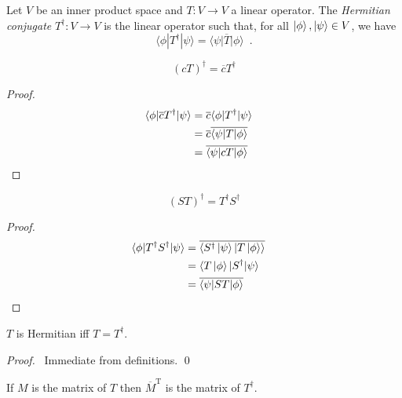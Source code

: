 \begin{df}
Let $V$ be an inner product space and $T : V \rightarrow V$ a linear operator. The \emph{Hermitian conjugate} $T^\dagger : V \rightarrow V$ is the linear operator such that, for all $\ket{\phi}, \ket{\psi} \in V$, we have
\[ \langle \phi | T^\dagger | \psi \rangle = \overline{\langle \psi | T | \phi \rangle} \enspace . \]
\end{df}

\begin{prop}
\[ (cT)^\dagger = \overline{c} T^\dagger \]
\end{prop}

\begin{proof}
\pf
\begin{align*}
\langle \phi | \overline{c} T^\dagger | \psi \rangle
& = \overline{c} \langle \phi | T^\dagger | \psi \rangle \\
& = \overline{c} \overline{\langle \psi | T | \phi \rangle} \\
& = \overline{\langle \psi | cT | \phi \rangle} & \qed
\end{align*}
\end{proof}

\begin{prop}
\[ (ST)^\dagger = T^\dagger S^\dagger \]
\end{prop}

\begin{proof}
\pf
\begin{align*}
\langle \phi | T^\dagger S^\dagger | \psi \rangle
& = \overline{\langle S^\dagger \ket{\psi} | T \ket{\phi} \rangle} \\
& = \langle T \ket{\phi} | S^\dagger | \psi \rangle \\
& = \overline{\langle \psi | S T | \phi \rangle} & \qed
\end{align*}
\end{proof}

\begin{prop}
$T$ is Hermitian iff $T = T^\dagger$.
\end{prop}

\begin{proof}
\pf\ Immediate from definitions. \qed
\end{proof}

\begin{prop}
If $M$ is the matrix of $T$ then $\overline{M}^\mathrm{T}$ is the matrix of $T^\dagger$.
\end{prop}


